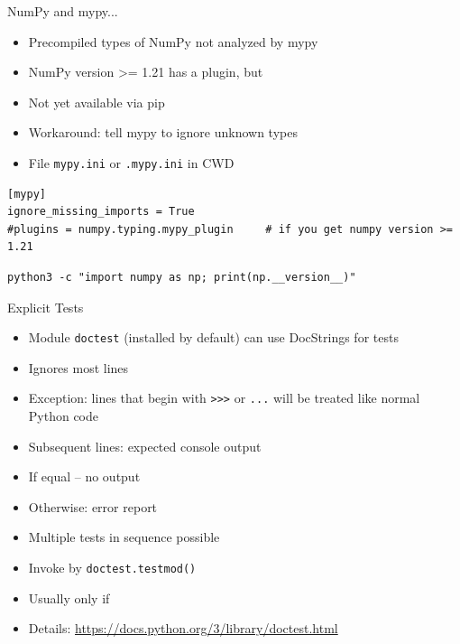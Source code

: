 \begin{frame}[fragile]{NumPy and mypy...}
%
\begin{itemize}
\item Precompiled types of NumPy not analyzed by mypy
\item NumPy version >= 1.21 has a plugin, but
\item Not yet available via pip
\item Workaround: tell mypy to ignore unknown types
\item File \texttt{mypy.ini} or \texttt{.mypy.ini} in CWD
\end{itemize}
%
\begin{cmdbox}
\begin{verbatim}
[mypy]
ignore_missing_imports = True
#plugins = numpy.typing.mypy_plugin     # if you get numpy version >= 1.21
\end{verbatim}
\end{cmdbox}
%
\begin{hintbox}
\begin{verbatim}
python3 -c "import numpy as np; print(np.__version__)"
\end{verbatim}
\end{hintbox}
%
\end{frame}


\begin{frame}{Explicit Tests}
%
\begin{itemize}
\item Module \texttt{doctest} (installed by default) can use DocStrings for tests
\item Ignores most lines
\item Exception: lines that begin with \texttt{>{}>{}>} or \texttt{...} will be treated like normal Python code
\item Subsequent lines: expected console output
\item If equal -- no output
\item Otherwise: error report
\item Multiple tests in sequence possible
\item Invoke by \texttt{doctest.testmod()}
\item Usually only if 
\item Details: \url{https://docs.python.org/3/library/doctest.html}
\end{itemize}
%
\end{frame}

